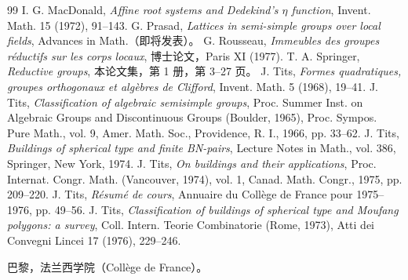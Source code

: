 \begin{thebibliography}{99}
 I. G. MacDonald, \emph{Affine root systems and Dedekind's $\eta$ function}, Invent. Math. 15 (1972), 91--143.
 G. Prasad, \emph{Lattices in semi-simple groups over local fields}, Advances in Math.（即将发表）。
 G. Rousseau, \emph{Immeubles des groupes réductifs sur les corps locaux}, 博士论文，Paris XI (1977).
 T. A. Springer, \emph{Reductive groups}, 本论文集，第 1 册，第 3--27 页。
 J. Tits, \emph{Formes quadratiques, groupes orthogonaux et algèbres de Clifford}, Invent. Math. 5 (1968), 19--41.
 J. Tits, \emph{Classification of algebraic semisimple groups}, Proc. Summer Inst. on Algebraic Groups and Discontinuous Groups (Boulder, 1965), Proc. Sympos. Pure Math., vol. 9, Amer. Math. Soc., Providence, R. I., 1966, pp. 33--62.
 J. Tits, \emph{Buildings of spherical type and finite BN-pairs}, Lecture Notes in Math., vol. 386, Springer, New York, 1974.
 J. Tits, \emph{On buildings and their applications}, Proc. Internat. Congr. Math. (Vancouver, 1974), vol. 1, Canad. Math. Congr., 1975, pp. 209--220.
 J. Tits, \emph{Résumé de cours}, Annuaire du Collège de France pour 1975--1976, pp. 49--56.
 J. Tits, \emph{Classification of buildings of spherical type and Moufang polygons: a survey}, Coll. Intern. Teorie Combinatorie (Rome, 1973), Atti dei Convegni Lincei 17 (1976), 229--246.
\end{thebibliography}
\par\noindent 巴黎，法兰西学院（Collège de France）。
